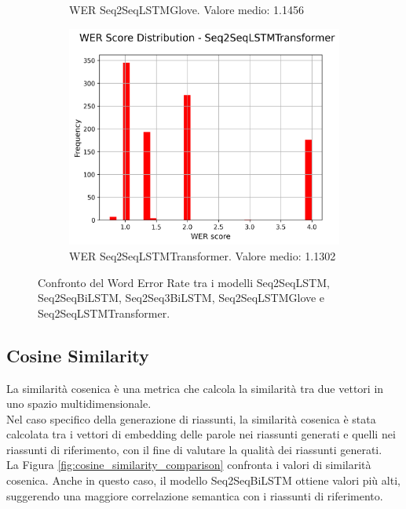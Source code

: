 \begin{figure}[H]
\begin{subfigure}{0.22\textwidth}
        \caption{WER Seq2SeqLSTMGlove. Valore medio: 1.1456}
    \end{subfigure}
    \hfill
    \begin{subfigure}{0.22\textwidth}
        \centering
        \includegraphics[width=\textwidth]{media/Seq2SeqLSTMTransformer_wer_scores.png}
        \caption{WER Seq2SeqLSTMTransformer. Valore medio: 1.1302}
    \end{subfigure}

    \caption{Confronto del Word Error Rate tra i modelli Seq2SeqLSTM, Seq2SeqBiLSTM, Seq2Seq3BiLSTM, Seq2SeqLSTMGlove e Seq2SeqLSTMTransformer.}
    \label{fig:wer_comparison}
\end{figure}


\subsection{Cosine Similarity}
La similarit\`a cosenica \`e una metrica che calcola la similarit\`a tra due vettori in uno spazio multidimensionale.\\
Nel caso specifico della generazione di riassunti, la similarit\`a cosenica \`e stata calcolata tra i vettori di embedding delle parole nei riassunti generati e quelli nei riassunti di riferimento, con il fine di valutare la qualit\`a dei riassunti generati.\\
La Figura \ref{fig:cosine_similarity_comparison} confronta i valori di similarit\`a cosenica. Anche in questo caso, il modello Seq2SeqBiLSTM ottiene valori pi\`u alti, suggerendo una maggiore correlazione semantica con i riassunti di riferimento.

